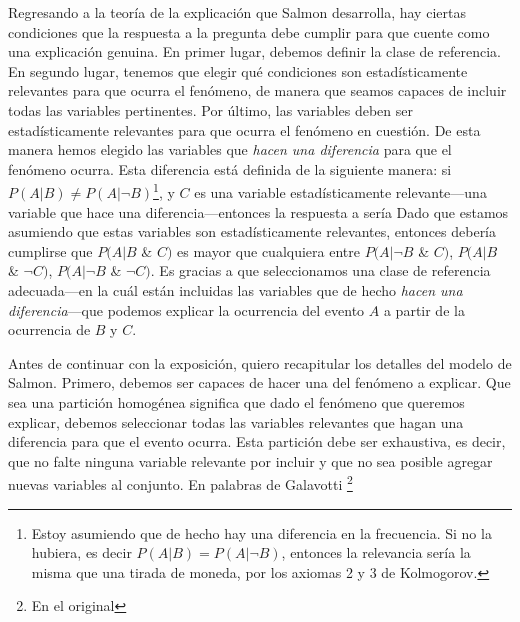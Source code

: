 Regresando a la teoría de la explicación que Salmon
desarrolla, hay ciertas condiciones que la respuesta a la
pregunta  debe cumplir para que
cuente como una explicación genuina. En primer lugar,
debemos definir la clase de referencia. En segundo lugar,
tenemos que elegir qué condiciones son estadísticamente
relevantes para que ocurra el fenómeno, de manera que seamos
capaces de incluir todas las variables pertinentes. Por último, las
variables deben ser estadísticamente relevantes para que
ocurra el
fenómeno en cuestión. De esta manera hemos elegido las
variables que \emph{hacen una diferencia} para que el
fenómeno ocurra. Esta diferencia está definida de la
siguiente manera: si $ P( A | B ) \neq P( A | \neg{ B } )
$\footnote{
  Estoy asumiendo que de hecho hay una diferencia en la
  frecuencia. Si no la hubiera, es decir $ P( A | B ) = P( A
  | \neg{ B } ) $, entonces la relevancia sería la misma que
  una tirada de moneda, por los axiomas 2 y	3 de Kolmogorov. 
},
y $C$ es una variable estadísticamente relevante---una
variable que hace una diferencia---entonces la respuesta a
 sería  Dado que estamos asumiendo que estas variables son
estadísticamente relevantes, entonces debería cumplirse que
$ P( A | B$ \& $C )$ es mayor que cualquiera entre $ P( A |
\neg{ B }$ \& $C ) $, $ P( A | B$ \& $\neg{ C } ) $, $ P( A
| \neg{ B }$ \& $\neg{ C } ) $. Es gracias a que
seleccionamos una clase de referencia adecuada---en la cuál
están incluidas las variables que de hecho \emph{hacen una
diferencia}---que podemos explicar la ocurrencia del evento
$ A $ a partir de la ocurrencia de $ B $ y $ C $.

Antes de continuar con la exposición, quiero recapitular
los detalles del modelo de Salmon. Primero, debemos ser
capaces de hacer una  del
fenómeno a explicar. Que sea una partición homogénea
significa que dado el fenómeno que queremos explicar,
debemos seleccionar todas las variables relevantes que
hagan una diferencia para que el evento ocurra. Esta
partición debe ser exhaustiva, es decir, que no falte
ninguna variable relevante por incluir y que no sea
posible agregar nuevas variables al conjunto. En palabras
de Galavotti \parencite{Galavotti2018}\footnote{
  En el original 
} 

